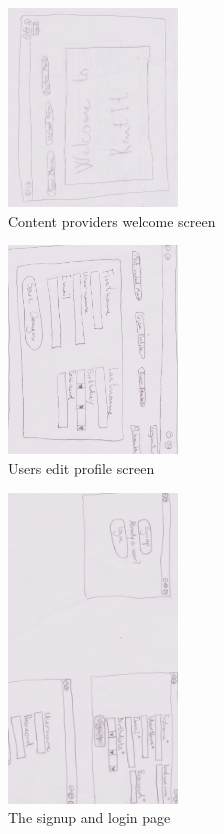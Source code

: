 \begin{figure}[!ht]
  \centering
    \includegraphics[angle=90, width=0.4\textwidth]{Parts/Appendix/Images/PaperMockup/CPWelcome}
  \caption{Content providers welcome screen}
  \label{fig:Appendix_GUI_sketches_CPWelcome}
\end{figure}
\begin{figure}[!ht]
  \centering
    \includegraphics[angle=90, width=0.4\textwidth]{Parts/Appendix/Images/PaperMockup/EditProfile}
  \caption{Users edit profile screen}
  \label{fig:Appendix_GUI_sketches_EditProfile}
\end{figure}
\begin{figure}[!ht]
  \centering
    \includegraphics[angle=90, width=0.4\textwidth]{Parts/Appendix/Images/PaperMockup/LoginSignup}
  \caption{The signup and login page}
  \label{fig:Appendix_GUI_sketches_LoginSignup}
\end{figure}
